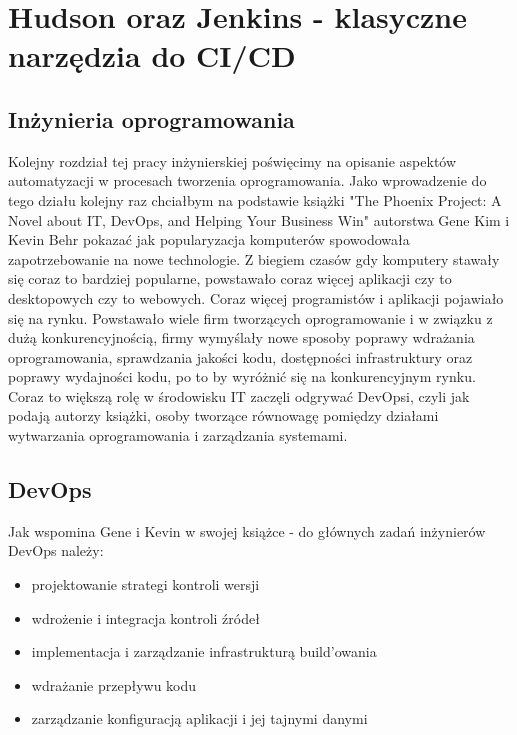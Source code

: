 \section{Hudson oraz Jenkins - klasyczne narzędzia do CI/CD}

\subsection{Inżynieria oprogramowania}
Kolejny rozdział tej pracy inżynierskiej poświęcimy na opisanie aspektów automatyzacji w procesach tworzenia oprogramowania. 
Jako wprowadzenie do tego działu kolejny raz chciałbym na podstawie książki "The Phoenix Project: A Novel about IT, DevOps, and Helping Your Business Win" autorstwa Gene Kim i Kevin Behr pokazać jak popularyzacja komputerów spowodowała zapotrzebowanie na nowe technologie. 
Z biegiem czasów gdy komputery stawały się coraz to bardziej popularne, powstawało coraz więcej aplikacji czy to desktopowych czy to webowych. Coraz więcej programistów i aplikacji pojawiało się na rynku. Powstawało wiele firm tworzących oprogramowanie i w związku z dużą konkurencyjnością, firmy wymyślały nowe sposoby poprawy wdrażania oprogramowania, sprawdzania jakości kodu, dostępności infrastruktury oraz poprawy wydajności kodu, po to by wyróżnić się na konkurencyjnym rynku. Coraz to większą rolę w środowisku IT zaczęli odgrywać  DevOpsi, czyli jak podają autorzy książki, osoby tworzące równowagę pomiędzy działami wytwarzania oprogramowania i zarządzania systemami.  


\subsection{DevOps} 
Jak wspomina Gene i Kevin w swojej książce - do głównych zadań inżynierów DevOps należy:
\begin{itemize}
    \item projektowanie strategi kontroli wersji
    \item wdrożenie i integracja kontroli źródeł
    \item implementacja i zarządzanie infrastrukturą build'owania
    \item wdrażanie przepływu kodu
    \item zarządzanie konfiguracją aplikacji i jej tajnymi danymi
\end{itemize}

